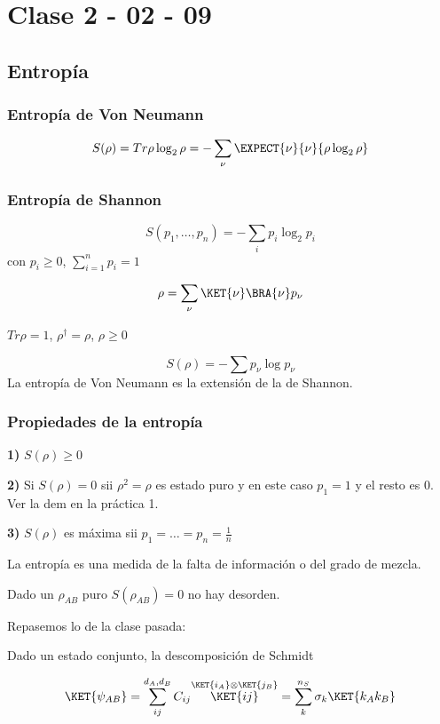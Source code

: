 \chapter{Clase 2 - 02 - 09}

\section{Entropía}

\subsection{Entropía de Von Neumann }

\[
S(\rho)=Tr\rho\log_{2}\rho=-\sum_{\nu}\EXPECT{\nu}{\nu}{\rho\log_{2}\rho}
\]


\subsection{Entropía de Shannon}

\[
S(p_{1},\dots,p_{n})=-\sum_{i}p_{i}\log_{2}p_{i}
\]
con $p_{i}\geq0$, $\sum_{i=1}^{n}p_{i}=1$

\[
\rho=\sum_{\nu}\KET{\nu}\BRA{\nu}p_{\nu}
\]

$Tr\rho=1$, $\rho^{\dagger}=\rho$, $\rho\geq0$

\[
S(\rho)=-\sum p_{\nu}\log p_{\nu}
\]
 La entropía de Von Neumann es la extensión de la de Shannon.

\subsection{Propiedades de la entropía}

\textbf{1)} $S(\rho)\geq0$

\textbf{2)} Si $S(\rho)=0$ sii $\rho^{2}=\rho$ es estado puro y
en este caso $p_{1}=1$ y el resto es 0. Ver la dem en la práctica
1. 

\textbf{3) }$S(\rho)$ es máxima sii $p_{1}=\dots=p_{n}=\frac{1}{n}$ 

La entropía es una medida de la falta de información o del grado de
mezcla.

Dado un $\rho_{AB}$ puro $S(\rho_{AB})=0$ no hay desorden.

Repasemos lo de la clase pasada:

Dado un estado conjunto, la descomposición de Schmidt

\[
\KET{\psi_{AB}}=\sum_{ij}^{d_{A},d_{B}}C_{ij}\overset{\KET{i_{A}}\otimes\KET{j_{B}}}{\KET{ij}}=\sum_{k}^{n_{S}}\sigma_{k}\KET{k_{A}k_{B}}
\]

